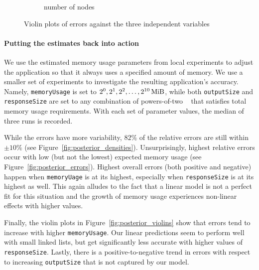 \documentclass{article}
\begin{document}
\begin{figure}
\begin{subfigure}[t]{0.49\textwidth}
    \caption{number of nodes}
  \end{subfigure}
  \caption{Violin plots of errors against the three independent variables}
  \label{fig:prediction_violins}
\end{figure}

\paragraph{Putting the estimates back into action}

We use the estimated memory usage parameters from local experiments to adjust
the application so that it always uses a specified amount of memory. We use a
smaller set of experiments to investigate the resulting application's accuracy.
Namely, \texttt{memoryUsage} is set to $2^0, 2^1, 2^2, \dots,
\SI[exponent-base = 2]{e10}{\mebi\byte}$, while both \texttt{outputSize} and
\texttt{responseSize} are set to any combination of powers-of-two
\si{\mebi\byte} that satisfies total memory usage requirements. With each set of
parameter values, the median of three runs is recorded.

While the errors have more variability, $82\%$ of the relative errors are still
within $\pm10\%$ (see Figure~\ref{fig:posterior_densities}). Unsurprisingly,
highest relative errors occur with low (but not the lowest) expected memory
usage (see Figure~\ref{fig:posterior_errors}). Highest overall errors (both
positive and negative) happen when \texttt{memoryUage} is at its highest,
especially when \texttt{responseSize} is at its highest as well. This again
alludes to the fact that a linear model is not a perfect fit for this situation
and the growth of memory usage experiences non-linear effects with higher
values.

Finally, the violin plots in Figure~\ref{fig:posterior_violins} show that errors
tend to increase with higher \texttt{memoryUsage}. Our linear predictions seem
to perform well with small linked lists, but get significantly less accurate
with higher values of \texttt{responseSize}. Lastly, there is a
positive-to-negative trend in errors with respect to increasing
\texttt{outputSize} that is not captured by our model.
\end{document}
